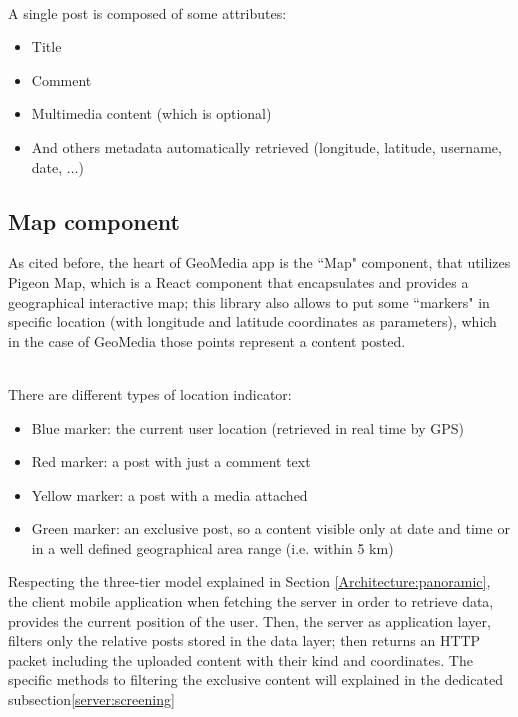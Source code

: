 \documentclass[conference]{IEEEtran}
\begin{document}
\\
A single post is composed of some attributes:
\begin{itemize}
    \item Title
    \item Comment
    \item Multimedia content (which is optional)
    \item And others metadata automatically retrieved (longitude, latitude, username, date, ...)
\end{itemize}

\subsection{Map component}

As cited before, the heart of GeoMedia app is the ``Map" component, that utilizes Pigeon Map\cite{b8}, which is a React component that encapsulates and provides a geographical interactive map; this library also allows to put some ``markers" in specific location (with longitude and latitude coordinates as parameters), which in the case of GeoMedia those points represent a content posted.

\\

There are different types of location indicator:
\begin{itemize}
\item Blue marker: the current user location (retrieved in real time by GPS)
\item Red marker: a post with just a comment text
\item Yellow marker: a post with a media attached
\item Green marker: an exclusive post, so a content visible only at date and time or in a well defined geographical area range (i.e. within 5 km)
\end{itemize}

Respecting the three-tier model explained in Section \ref{Architecture:panoramic}, the client mobile application when fetching the server in order to retrieve data, provides the current position of the user. Then, the server as application layer, filters only the relative posts stored in the data layer; then returns an HTTP packet including the uploaded content with their kind and coordinates.
The specific methods to filtering the exclusive content will explained in the dedicated subsection\ref{server:screening}
\end{document}
